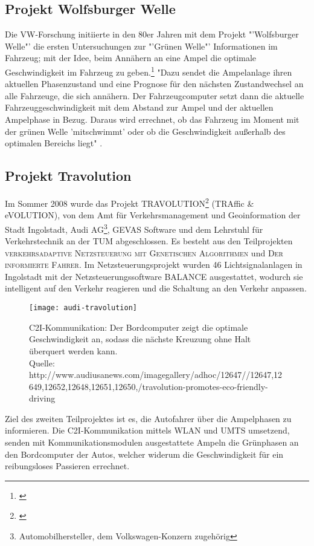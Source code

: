 \subsection{Projekt Wolfsburger Welle}
Die \gls{VW}-Forschung initiierte in den 80er Jahren mit dem Projekt "'Wolfsburger Welle"' die ersten Untersuchungen zur "'Grünen Welle"' Informationen im Fahrzeug; mit der Idee, beim Annähern an eine Ampel die optimale Geschwindigkeit im Fahrzeug zu geben.\footnote{\cite{Welle}} "Dazu sendet die Ampelanlage ihren aktuellen Phasenzustand und eine Prognose für den nächsten Zustandwechsel an alle Fahrzeuge, die sich annähern. Der Fahrzeugcomputer setzt dann die aktuelle Fahrzeuggeschwindigkeit mit dem Abstand zur Ampel und der aktuellen Ampelphase in Bezug. Daraus wird errechnet, ob das Fahrzeug im Moment mit der grünen Welle ’mitschwimmt’ oder ob die Geschwindigkeit außerhalb des optimalen Bereichs liegt" \cite{MenschMaschine}.
\subsection{Projekt Travolution}
Im Sommer 2008 wurde das Projekt TRAVOLUTION\footnote{\cite{Travolution}} (TRAffic \& eVOLUTION), von dem Amt für Verkehrsmanagement und Geoinformation der Stadt Ingolstadt, Audi AG\footnote{Automobilhersteller, dem Volkswagen-Konzern zugehörig}, GEVAS Software und dem Lehrstuhl für Verkehrstechnik an der \gls{TUM} abgeschlossen. Es besteht aus den Teilprojekten \textsc{verkehrsadaptive Netzsteuerung mit Genetischen Algorithmen} und \textsc{Der informierte Fahrer}. Im Netzsteuerungsprojekt wurden 46 Lichtsignalanlagen in Ingolstadt mit der Netzsteuerungssoftware BALANCE ausgestattet, wodurch sie intelligent auf den Verkehr reagieren und die Schaltung an den Verkehr anpassen. 
\begin{figure}[H]  
    \centering  
    \texttt{[image: audi-travolution]}
    \label{fig:travolution}
    \caption[Projekt Travolution]{\gls{C2I}-Kommunikation: Der Bordcomputer zeigt die optimale Geschwindigkeit an, sodass die nächste Kreuzung ohne Halt überquert werden kann.\\ Quelle: {http://www.audiusanews.com/imagegallery/adhoc/12647//12647,12649,12652,12648,12651,12650,/travolution-promotes-eco-friendly-driving}}
\end{figure}
Ziel des zweiten Teilprojektes ist es, die Autofahrer über die Ampelphasen zu informieren. Die \gls{C2I}-Kommunikation mittels \gls{WLAN} und \gls{UMTS} umsetzend, senden mit Kommunikationsmodulen ausgestattete Ampeln die Grünphasen an den Bordcomputer der Autos, welcher widerum die Geschwindigkeit für ein reibungsloses Passieren errechnet.
